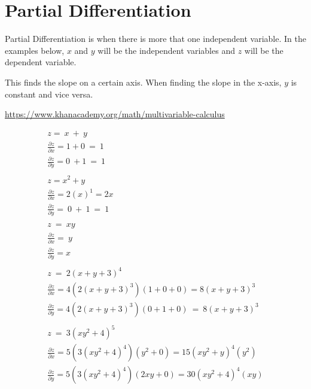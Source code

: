 \documentclass{article}
\begin{document}
\section{Partial Differentiation}

Partial Differentiation is when there is more that one independent variable. In the examples below, $x$ and $y$ will be the independent variables and $z$ will be the dependent variable. 

This finds the slope on a certain axis. When finding the slope in the x-axis, $y$ is constant and vice versa. 

\url{https://www.khanacademy.org/math/multivariable-calculus}

\begin{equation}
\begin{array}{l}
z=\ x\ +\ y\\
\frac{\partial z}{\partial x} =1+0\ =\ 1\\
\frac{\partial z}{\partial y} =0\ +1\ =\ 1\\
\\
z=x^{2} +y\\
\frac{\partial z}{\partial x} =2( x)^{1} =2x\\
\frac{\partial z}{\partial y} =\ 0\ +\ 1\ =\ 1\\
\\
z\ =\ xy\\
\frac{\partial z}{\partial x} =\ y\\
\frac{\partial z}{\partial y} =x\\
\\
z\ =\ 2( x+y+3)^{4}\\
\frac{\partial z}{\partial x} =4\left( 2( x+y+3)^{3}\right)( 1+0+0) =8( x+y+3)^{3}\\
\frac{\partial z}{\partial y} =4\left( 2( x+y+3)^{3}\right)( 0+1+0) \ =\ 8( x+y+3)^{3}\\
\\
z\ =\ 3\left( xy^{2} +4\right)^{5}\\
\frac{\partial z}{\partial x} =5\left( 3\left( xy^{2} +4\right)^{4}\right)\left( y^{2} +0\right) =15\left( xy^{2} +y\right)^{4}\left( y^{2}\right)\\
\frac{\partial z}{\partial y} =5\left( 3\left( xy^{2} +4\right)^{4}\right)( 2xy+0) =30\left( xy^{2} +4\right)^{4}( xy)
\end{array}
\end{equation}
\end{document}
